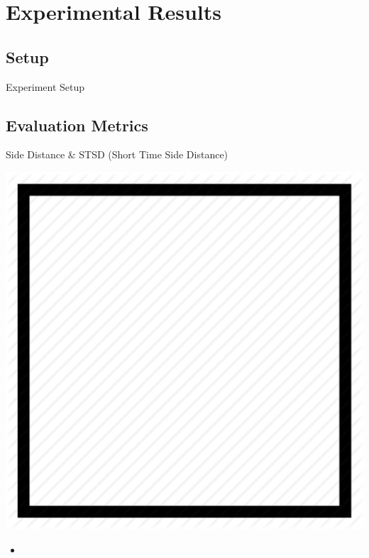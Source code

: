\section{Experimental Results}
\subsection{Setup}
\begin{frame}{Experiment Setup}
    
\end{frame}

\subsection{Evaluation Metrics}
\begin{frame}{Side Distance \& STSD (Short Time Side Distance)}
    \begin{center}
        \includegraphics[height=0.3\textheight]{assets/figures/square.png}
    \end{center}
    \begin{itemize}
        \item 
    \end{itemize}
\end{frame}

